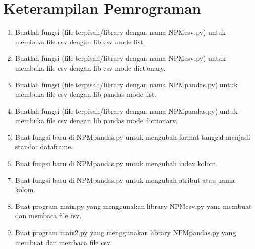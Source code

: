 \section{Keterampilan Pemrograman}
\begin{enumerate}
	\item Buatlah  fungsi  (file  terpisah/library  dengan  nama  NPMcsv.py)  untuk  membuka file csv dengan lib csv mode list.
	
	
	\item Buatlah  fungsi  (file  terpisah/library  dengan  nama  NPMcsv.py)  untuk  membuka file csv dengan lib csv mode dictionary.
	
	
	\item Buatlah fungsi (file terpisah/library dengan nama NPMpandas.py) untuk membuka file csv dengan lib pandas mode list.
	
	
	\item Buatlah fungsi (file terpisah/library dengan nama NPMpandas.py) untuk membuka file csv dengan lib pandas mode dictionary.
	
	
	\item  Buat fungsi baru di NPMpandas.py untuk mengubah format tanggal menjadi standar dataframe.
	
	
	\item Buat fungsi baru di NPMpandas.py untuk mengubah index kolom.
	
	
	\item Buat fungsi baru di NPMpandas.py untuk mengubah atribut atau nama kolom.
	
	
	\item Buat program main.py yang menggunakan library NPMcsv.py yang membuat dan membaca file csv.
	
	
	\item Buat program main2.py yang menggunakan library NPMpandas.py yang membuat dan membaca file csv.
	
	
\end{enumerate}
\newpage
